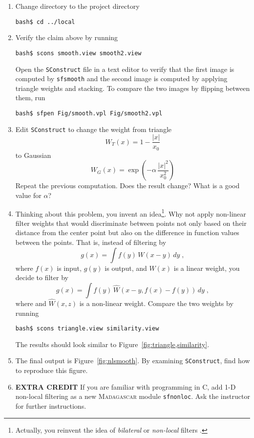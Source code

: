 \begin{enumerate}
\item Change directory to the project directory
\begin{verbatim}
bash$ cd ../local
\end{verbatim}
\item Verify the claim above by running
\begin{verbatim}
bash$ scons smooth.view smooth2.view
\end{verbatim}
Open the \texttt{SConstruct} file in a text editor to verify that the first image is computed by \texttt{sfsmooth} and the second 
image is computed by applying triangle weights and stacking. To compare the two images by flipping between them, run
\begin{verbatim}
bash$ sfpen Fig/smooth.vpl Fig/smooth2.vpl
\end{verbatim}
\item Edit \texttt{SConstruct} to change the weight from triangle
\begin{equation}
\label{eq:triangle}
W_T(x) = 1-\frac{|x|}{x_0}
\end{equation}
to Gaussian
\begin{equation}
\label{eq:gaussian}
W_G(x) = \exp{\left(-\alpha\,\frac{|x|^2}{x_0^2}\right)}
\end{equation}
Repeat the previous computation. Does the result change? What is a good value for $\alpha$? 
\item Thinking about this problem, you invent an idea\footnote{Actually, you reinvent the idea of \emph{bilateral} or \emph{non-local} filters
\cite[]{tomasi,gilboa}.}. Why not apply non-linear filter weights that would discriminate between points not only based on their distance
from the center point but also on the difference in function values
between the points. That is, instead of filtering by
\begin{equation}
\label{eq:local}
g(x) = \int f(y)\,W(x-y)\,dy\;,
\end{equation}
where $f(x)$ is input, $g(y)$ is output, and $W(x)$ is a linear weight, you decide to filter by
\begin{equation}
\label{eq:nonlocal}
g(x) = \int f(y)\,\hat{W}\left(x-y,f(x)-f(y)\right)\,dy\;,
\end{equation}
where and $\hat{W}(x,z)$ is a non-linear weight. Compare the two weights by running
\begin{verbatim}
bash$ scons triangle.view similarity.view
\end{verbatim}
The results should look similar to Figure~\ref{fig:triangle,similarity}.
\item The final output is Figure~\ref{fig:nlsmooth}. By examining \texttt{SConstruct}, find how to reproduce this figure.
\item \textbf{EXTRA CREDIT} If you are familiar with programming in C, add 1-D non-local filtering as a new \textsc{Madagascar} module \texttt{sfnonloc}. Ask the instructor for further instructions. 
\end{enumerate}

